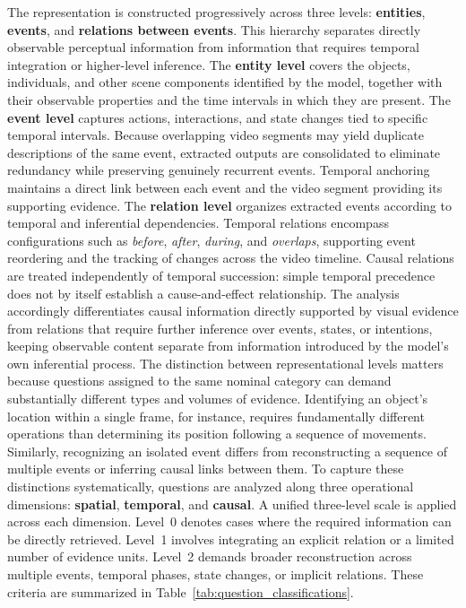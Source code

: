 The representation is constructed progressively across three levels: \textbf{entities}, \textbf{events}, and \textbf{relations between events}. This hierarchy separates directly observable perceptual information from information that requires temporal integration or higher-level inference.
The \textbf{entity level} covers the objects, individuals, and other scene components identified by the model, together with their observable properties and the time intervals in which they are present.
The \textbf{event level} captures actions, interactions, and state changes tied to specific temporal intervals. Because overlapping video segments may yield duplicate descriptions of the same event, extracted outputs are consolidated to eliminate redundancy while preserving genuinely recurrent events. Temporal anchoring maintains a direct link between each event and the video segment providing its supporting evidence.
The \textbf{relation level} organizes extracted events according to temporal and inferential dependencies. Temporal relations encompass configurations such as \textit{before}, \textit{after}, \textit{during}, and \textit{overlaps}, supporting event reordering and the tracking of changes across the video timeline. Causal relations are treated independently of temporal succession: simple temporal precedence does not by itself establish a cause-and-effect relationship. The analysis accordingly differentiates causal information directly supported by visual evidence from relations that require further inference over events, states, or intentions, keeping observable content separate from information introduced by the model's own inferential process.
The distinction between representational levels matters because questions assigned to the same nominal category can demand substantially different types and volumes of evidence. Identifying an object's location within a single frame, for instance, requires fundamentally different operations than determining its position following a sequence of movements. Similarly, recognizing an isolated event differs from reconstructing a sequence of multiple events or inferring causal links between them.
To capture these distinctions systematically, questions are analyzed along three operational dimensions: \textbf{spatial}, \textbf{temporal}, and \textbf{causal}. A unified three-level scale is applied across each dimension. Level~0 denotes cases where the required information can be directly retrieved. Level~1 involves integrating an explicit relation or a limited number of evidence units. Level~2 demands broader reconstruction across multiple events, temporal phases, state changes, or implicit relations. These criteria are summarized in Table~\ref{tab:question_classifications}.
